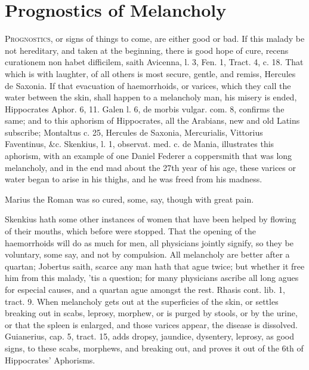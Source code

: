\chapter{Prognostics of Melancholy}\label{ch:prognostics}

\lettrine{P}{rognostics}, or signs of things to come, are either good or bad. If
this malady be not hereditary, and taken at the beginning, there is
good hope of cure, recens curationem non habet difficilem, saith
Avicenna, l. 3, Fen. 1, Tract. 4, c. 18. That which is with laughter,
of all others is most secure, gentle, and remiss, Hercules de Saxonia.
If that evacuation of haemorrhoids, or varices, which they call
the water between the skin, shall happen to a melancholy man, his
misery is ended, Hippocrates Aphor. 6, 11. Galen l. 6, de morbis
vulgar. com. 8, confirms the same; and to this aphorism of Hippocrates,
all the Arabians, new and old Latins subscribe; Montaltus c. 25,
Hercules de Saxonia, Mercurialis, Vittorius Faventinus, \&c. Skenkius,
l. 1, observat. med. c. de Mania, illustrates this aphorism, with an
example of one Daniel Federer a coppersmith that was long melancholy,
and in the end mad about the 27th year of his age, these varices or
water began to arise in his thighs, and he was freed from his madness.

Marius the Roman was so cured, some, say, though with great pain.

Skenkius hath some other instances of women that have been helped by
flowing of their mouths, which before were stopped. That the opening of
the haemorrhoids will do as much for men, all physicians jointly
signify, so they be voluntary, some say, and not by compulsion. All
melancholy are better after a quartan; Jobertus saith, scarce any
man hath that ague twice; but whether it free him from this malady,
'tis a question; for many physicians ascribe all long agues for
especial causes, and a quartan ague amongst the rest. Rhasis
cont. lib. 1, tract. 9. When melancholy gets out at the superficies of
the skin, or settles breaking out in scabs, leprosy, morphew, or is
purged by stools, or by the urine, or that the spleen is enlarged, and
those varices appear, the disease is dissolved. Guianerius, cap. 5,
tract. 15, adds dropsy, jaundice, dysentery, leprosy, as good signs, to
these scabs, morphews, and breaking out, and proves it out of the 6th
of Hippocrates' Aphorisms.

